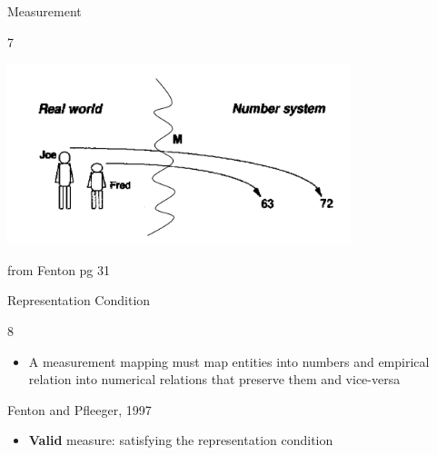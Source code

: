 \documentclass{beamer}
\begin{document}
\begin{frame}{\centerline{Measurement}}
7
\begin{center}
\includegraphics[width=100mm]{A2022.IDSEPC.SperimentazioneDeduzione/img-img09.png}
\newline
\end{center}

\begin{small}
\begin{center}
from Fenton pg 31
\end{center}
\end{small}

\end{frame}

\begin{frame}{\centerline{Representation Condition}}
8

\begin{itemize}
\item  A measurement mapping must map entities into numbers and empirical relation into numerical relations that preserve them and vice-versa
\end{itemize}
\begin{flushright}
Fenton and Pfleeger, 1997
\end{flushright}
\begin{itemize}
\item  \textbf{Valid} measure: satisfying the representation condition
\end{itemize}

\end{frame}
\end{document}
